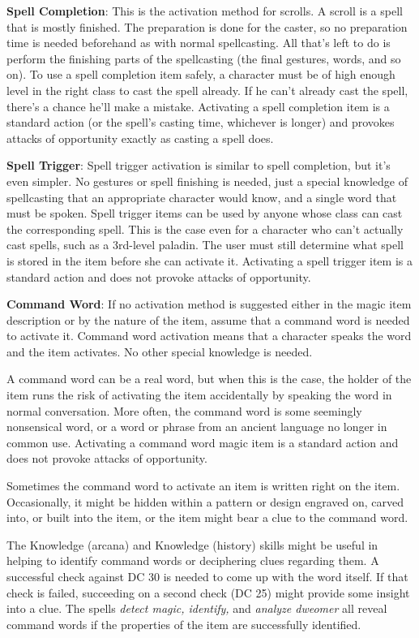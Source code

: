 \textbf{Spell Completion}: This is the activation method for scrolls. A scroll is a spell that is mostly finished. The preparation is done for the caster, so no preparation time is needed beforehand as with normal spellcasting. All that's left to do is perform the finishing parts of the spellcasting (the final gestures, words, and so on). To use a spell completion item safely, a character must be of high enough level in the right class to cast the spell already. If he can't already cast the spell, there's a chance he'll make a mistake. Activating a spell completion item is a standard action (or the spell's casting time, whichever is longer) and provokes attacks of opportunity exactly as casting a spell does.
				
\textbf{Spell Trigger}: Spell trigger activation is similar to spell completion, but it's even simpler. No gestures or spell finishing is needed, just a special knowledge of spellcasting that an appropriate character would know, and a single word that must be spoken. Spell trigger items can be used by anyone whose class can cast the corresponding spell. This is the case even for a character who can't actually cast spells, such as a 3rd-level paladin. The user must still determine what spell is stored in the item before she can activate it. Activating a spell trigger item is a standard action and does not provoke attacks of opportunity.
				
\textbf{Command Word}: If no activation method is suggested either in the magic item description or by the nature of the item, assume that a command word is needed to activate it. Command word activation means that a character speaks the word and the item activates. No other special knowledge is needed.
				
A command word can be a real word, but when this is the case, the holder of the item runs the risk of activating the item accidentally by speaking the word in normal conversation. More often, the command word is some seemingly nonsensical word, or a word or phrase from an ancient language no longer in common use. Activating a command word magic item is a standard action and does not provoke attacks of opportunity.
				
Sometimes the command word to activate an item is written right on the item. Occasionally, it might be hidden within a pattern or design engraved on, carved into, or built into the item, or the item might bear a clue to the command word.
				
The Knowledge (arcana) and Knowledge (history) skills might be useful in helping to identify command words or deciphering clues regarding them. A successful check against DC 30 is needed to come up with the word itself. If that check is failed, succeeding on a second check (DC 25) might provide some insight into a clue. The spells \textit{detect magic, identify, }and \textit{analyze dweomer }all reveal command words if the properties of the item are successfully identified.
				
